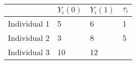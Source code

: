 \documentclass[]{article}
\begin{document}
\begin{longtable}[]{@{}llll@{}}
\toprule
\begin{minipage}[b]{0.20\columnwidth}\raggedright
\strut
\end{minipage} & \begin{minipage}[b]{0.16\columnwidth}\raggedright
\(Y_{i}(0)\)\strut
\end{minipage} & \begin{minipage}[b]{0.16\columnwidth}\raggedright
\(Y_{i}(1)\)\strut
\end{minipage} & \begin{minipage}[b]{0.16\columnwidth}\raggedright
\(\tau_i\)\strut
\end{minipage}\tabularnewline
\midrule
\endhead
\begin{minipage}[t]{0.20\columnwidth}\raggedright
Individual 1\strut
\end{minipage} & \begin{minipage}[t]{0.16\columnwidth}\raggedright
5\strut
\end{minipage} & \begin{minipage}[t]{0.16\columnwidth}\raggedright
6\strut
\end{minipage} & \begin{minipage}[t]{0.16\columnwidth}\raggedright
1\strut
\end{minipage}\tabularnewline
\begin{minipage}[t]{0.20\columnwidth}\raggedright
Individual 2\strut
\end{minipage} & \begin{minipage}[t]{0.16\columnwidth}\raggedright
3\strut
\end{minipage} & \begin{minipage}[t]{0.16\columnwidth}\raggedright
8\strut
\end{minipage} & \begin{minipage}[t]{0.16\columnwidth}\raggedright
5\strut
\end{minipage}\tabularnewline
\begin{minipage}[t]{0.20\columnwidth}\raggedright
Individual 3\strut
\end{minipage} & \begin{minipage}[t]{0.16\columnwidth}\raggedright
10\strut
\end{minipage} & \begin{minipage}[t]{0.16\columnwidth}\raggedright
12\strut
\end{minipage} & \begin{minipage}[t]{0.16\columnwidth}\raggedright

\end{minipage}
\end{longtable}
\end{document}
